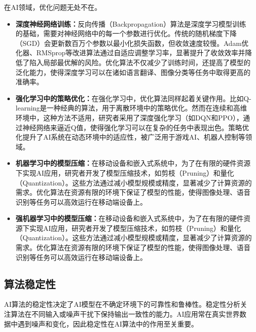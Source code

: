  在AI领域，优化问题无处不在。
 \begin{itemize}
\item {\bf 深度神经网络训练：}反向传播（Backpropagation）算法是深度学习模型训练的基础，需要对神经网络中的每一个参数进行优化。传统的随机梯度下降（SGD）会更新数百万个参数以最小化损失函数，但收敛速度较慢。Adam优化器、RMSprop等改进算法通过自适应调整学习率，显著提升了收敛效率并降低了陷入局部最优解的风险。优化算法不仅减少了训练时间，还提高了模型的泛化能力，使得深度学习可以在诸如语言翻译、图像分类等任务中取得更高的准确率。

\item {\bf 强化学习中的策略优化：}在强化学习中，优化算法同样起着关键作用。比如Q-learning是一种经典的算法，用于离散环境中的策略优化。然而在连续和高维环境中，这种方法不适用，研究者采用了深度强化学习（如DQN和PPO），通过神经网络来逼近Q值，使得强化学习可以在复杂的任务中表现出色。策略优化提升了AI系统在动态环境中的适应性，被广泛用于游戏AI、机器人控制等领域。
\item {\bf 机器学习中的模型压缩：}在移动设备和嵌入式系统中，为了在有限的硬件资源下实现AI应用，研究者开发了模型压缩技术，如剪枝（Pruning）和量化（Quantization）。这些方法通过减小模型规模或精度，显著减少了计算资源的需求。优化算法在资源有限的环境下保证了模型的性能，使得图像处理、语音识别等任务可以高效运行在移动端设备上。

\item {\bf 强机器学习中的模型压缩：}在移动设备和嵌入式系统中，为了在有限的硬件资源下实现AI应用，研究者开发了模型压缩技术，如剪枝（Pruning）和量化（Quantization）。这些方法通过减小模型规模或精度，显著减少了计算资源的需求。优化算法在资源有限的环境下保证了模型的性能，使得图像处理、语音识别等任务可以高效运行在移动端设备上。
\end{itemize}

\subsection{ 算法稳定性}
AI算法的稳定性决定了AI模型在不确定环境下的可靠性和鲁棒性。稳定性分析关注算法在不同输入或噪声干扰下保持输出一致性的能力。AI应用常在真实世界数据中遇到噪声和变化，因此稳定性在AI算法中的作用至关重要。


